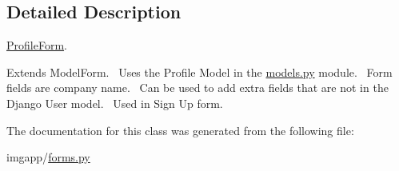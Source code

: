 \subsection{Detailed Description}
\hyperlink{classimgapp_1_1forms_1_1ProfileForm}{Profile\+Form}. 

Extends Model\+Form.~\newline
 Uses the Profile Model in the \hyperlink{models_8py}{models.\+py} module.~\newline
 Form fields are company name.~\newline
 Can be used to add extra fields that are not in the Django User model.~\newline
 Used in Sign Up form. 

The documentation for this class was generated from the following file\+:\begin{DoxyCompactItemize}
\item 
imgapp/\hyperlink{forms_8py}{forms.\+py}\end{DoxyCompactItemize}
